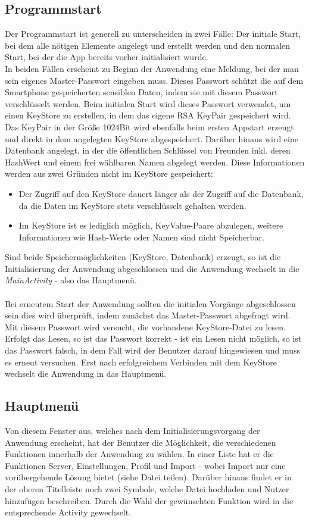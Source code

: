 \documentclass[10pt, a4paper,headsepline,pointednumbers]{scrreprt}
\begin{document}
\subsection{Programmstart}
Der Programmstart ist generell zu unterscheiden in zwei Fälle: Der initiale Start, bei dem alle nötigen Elemente angelegt und erstellt werden und den normalen Start, bei der die App bereits vorher initialisiert wurde. \\
In beiden Fällen erscheint zu Beginn der Anwendung eine Meldung, bei der man sein eigenes Master-Passwort eingeben muss. Dieses Passwort schützt die auf dem Smartphone gespeicherten sensiblen Daten, indem sie mit diesem Passwort verschlüsselt werden. Beim initialen Start wird dieses Passwort verwendet, um einen KeyStore zu erstellen, in dem das eigene RSA KeyPair gespeichert wird. Das KeyPair in der Größe 1024Bit wird ebenfalls beim ersten Appstart erzeugt und direkt in dem angelegten KeyStore abgespeichert. Darüber hinaus wird eine Datenbank angelegt, in der die öffentlichen Schlüssel von Freunden inkl. deren HashWert und einem frei wählbaren Namen abgelegt werden. Diese Informationen werden aus zwei Gründen nicht im KeyStore gespeichert:
\begin{itemize}
\item Der Zugriff auf den KeyStore dauert länger als der Zugriff auf die Datenbank, da die Daten im KeyStore stets verschlüsselt gehalten werden.
\item Im KeyStore ist es lediglich möglich, KeyValue-Paare abzulegen, weitere Informationen wie Hash-Werte oder Namen sind nicht Speicherbar.
\end{itemize}
Sind beide Speichermöglichkeiten (KeyStore, Datenbank) erzeugt, so ist die Initialisierung der Anwendung abgeschlossen und die Anwendung wechselt in die \textit{MainActivity} - also das Hauptmenü.\\ \\
Bei erneutem Start der Anwendung sollten die initialen Vorgänge abgeschlossen sein dies wird überprüft, indem zunächst das Master-Passwort abgefragt wird. Mit diesem Passwort wird versucht, die vorhandene KeyStore-Datei zu lesen. Erfolgt das Lesen, so ist das Passwort korrekt - ist ein Lesen nicht möglich, so ist das Passwort falsch, in dem Fall wird der Benutzer darauf hingewiesen und muss es erneut versuchen. Erst nach erfolgreichem Verbinden mit dem KeyStore wechselt die Anwendung in das Hauptmenü.


\subsection{Hauptmenü}
Von diesem Fenster aus, welches nach dem Initialisierungsvorgang der Anwendung erscheint, hat der Benutzer die Möglichkeit, die verschiedenen Funktionen innerhalb der Anwendung zu wählen. In einer Liste hat er die Funktionen Server, Einstellungen, Profil und Import - wobei Import nur eine vorübergehende Lösung bietet  (siehe Datei teilen). Darüber hinaus findet er in der oberen Titelleiste noch zwei Symbole, welche Datei hochladen und Nutzer hinzufügen beschreiben. Durch die Wahl der gewünschten Funktion wird in die entsprechende Activity gewechselt.
\end{document}
